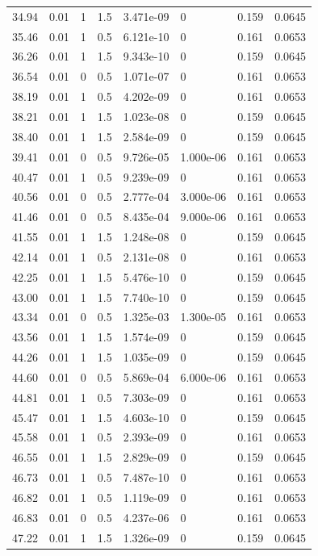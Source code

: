 \documentclass[preview]{standalone}
\begin{document}
{{{\begin{tabular}{L{1.2cm}C{1.2cm} C{0.3cm}C{0.5cm} C{1.4cm}C{1.4cm} C{1.4cm}C{1.4cm}}
  34.94  &  0.01  & 1     & 1.5 &  3.471e-09  & 0  & 0.159 &  0.0645   \\ 
  35.46  &  0.01  & 1     & 0.5 &  6.121e-10  & 0  & 0.161 &  0.0653   \\ 
  36.26  &  0.01  & 1     & 1.5 &  9.343e-10  & 0  & 0.159 &  0.0645   \\ 
  36.54  &  0.01  & 0     & 0.5 &  1.071e-07  & 0  & 0.161 &  0.0653   \\ 
  38.19  &  0.01  & 1     & 0.5 &  4.202e-09  & 0  & 0.161 &  0.0653   \\ 
  38.21  &  0.01  & 1     & 1.5 &  1.023e-08  & 0  & 0.159 &  0.0645   \\ 
  38.40  &  0.01  & 1     & 1.5 &  2.584e-09  & 0  & 0.159 &  0.0645   \\ 
  39.41  &  0.01  & 0     & 0.5 &  9.726e-05  & 1.000e-06  & 0.161 &  0.0653   \\ 
  40.47  &  0.01  & 1     & 0.5 &  9.239e-09  & 0  & 0.161 &  0.0653   \\ 
  40.56  &  0.01  & 0     & 0.5 &  2.777e-04  & 3.000e-06  & 0.161 &  0.0653   \\ 
  41.46  &  0.01  & 0     & 0.5 &  8.435e-04  & 9.000e-06  & 0.161 &  0.0653   \\ 
  41.55  &  0.01  & 1     & 1.5 &  1.248e-08  & 0  & 0.159 &  0.0645   \\ 
  42.14  &  0.01  & 1     & 0.5 &  2.131e-08  & 0  & 0.161 &  0.0653   \\ 
  42.25  &  0.01  & 1     & 1.5 &  5.476e-10  & 0  & 0.159 &  0.0645   \\ 
  43.00  &  0.01  & 1     & 1.5 &  7.740e-10  & 0  & 0.159 &  0.0645   \\ 
  43.34  &  0.01  & 0     & 0.5 &  1.325e-03  & 1.300e-05  & 0.161 &  0.0653   \\ 
  43.56  &  0.01  & 1     & 1.5 &  1.574e-09  & 0  & 0.159 &  0.0645   \\ 
  44.26  &  0.01  & 1     & 1.5 &  1.035e-09  & 0  & 0.159 &  0.0645   \\ 
  44.60  &  0.01  & 0     & 0.5 &  5.869e-04  & 6.000e-06  & 0.161 &  0.0653   \\ 
  44.81  &  0.01  & 1     & 0.5 &  7.303e-09  & 0  & 0.161 &  0.0653   \\ 
  45.47  &  0.01  & 1     & 1.5 &  4.603e-10  & 0  & 0.159 &  0.0645   \\ 
  45.58  &  0.01  & 1     & 0.5 &  2.393e-09  & 0  & 0.161 &  0.0653   \\ 
  46.55  &  0.01  & 1     & 1.5 &  2.829e-09  & 0  & 0.159 &  0.0645   \\ 
  46.73  &  0.01  & 1     & 0.5 &  7.487e-10  & 0  & 0.161 &  0.0653   \\ 
  46.82  &  0.01  & 1     & 0.5 &  1.119e-09  & 0  & 0.161 &  0.0653   \\ 
  46.83  &  0.01  & 0     & 0.5 &  4.237e-06  & 0  & 0.161 &  0.0653   \\ 
  47.22  &  0.01  & 1     & 1.5 &  1.326e-09  & 0  & 0.159 &  0.0645   \\ 
\hline 
\end{tabular} 

}}}
\end{document}
